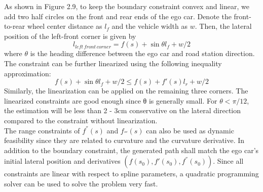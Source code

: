 \documentclass{report}
\begin{document}
\indent
As shown in Figure 2.9, to keep the boundary constraint convex and linear, we add two half circles on the front and rear ends of the ego car. Denote the front-to-rear wheel center distance as $l_f$ and the vehicle width as $w$. Then, the lateral position of the left-front corner is given by
\begin{equation}
	l_{left \, front \, corner} = f(s) + \sin \theta l_f +w/2
\end{equation}
where $\theta$ is the heading difference between the ego car and road station direction. The constraint can be further linearized using the following inequality
approximation:
\begin{equation}
 f(s) + \sin \theta l_f +w/2 \leq f(s)+ f'(s)l_r+w/2
\end{equation}
Similarly, the linearization can be applied on the remaining three corners. The linearized constraints are good enough since θ is generally small. For
$\theta < \pi/12$, the estimation will be less than 2 - 3cm conservative on the lateral direction compared to the constraint without linearization.\\
\indent
The range constraints of $f^{''}(s)$ and $f_{'''}(s)$ can also be used as dynamic feasibility since they are related to curvature and the curvature derivative. In addition to the boundary constraint, the generated path shall match the ego car’s initial lateral position and derivatives $(f(s_0), f'(s_0), f^{''}(s_0))$. Since all constraints are linear with respect to spline parameters, a quadratic programming solver can be used to solve the problem very fast.
\end{document}
